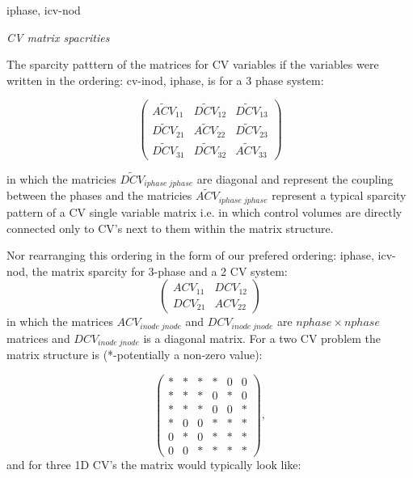 \par\noindent
iphase, icv-nod

\par\noindent
{\it CV matrix spacrities} 

The sparcity patttern of the matrices for CV variables if the variables were written 
in the ordering: cv-inod, iphase, is for a 3 phase system: 

\begin{equation}
  \begin{pmatrix}
\widetilde {ACV}_{11}  &  \widetilde {DCV}_{12}  &  \widetilde {DCV}_{13} \\
\widetilde {DCV}_{21}  &  \widetilde {ACV}_{22}  &  \widetilde {DCV}_{23} \\
\widetilde {DCV}_{31}  &  \widetilde {DCV}_{32}  &  \widetilde {ACV}_{33} 
  \end{pmatrix}
\label{CV-mat-spar}
\end{equation}

in which the matricies $\widetilde {DCV}_{iphase\; jphase}$ are diagonal and represent the 
coupling between the phases and the matricies $\widetilde {ACV}_{iphase\; jphase}$ represent 
a typical sparcity pattern of a CV single variable matrix i.e. in which control volumes are 
directly connected only to CV's next to them within the matrix structure. 

Nor rearranging this ordering in the form of our prefered ordering:  iphase, icv-nod, 
the matrix sparcity for 3-phase and a 2 CV system:
\begin{equation}
  \begin{pmatrix}
ACV_{11}  &  DCV_{12}   \\
DCV_{21}  &  ACV_{22} 
  \end{pmatrix}
\label{CV-mat-spar}
\end{equation}
in which the matrices $ACV_{inode\; jnode}$ and $DCV_{inode\; jnode}$ are $nphase \times nphase$ matrices and $DCV_{inode\; jnode}$ 
is a diagonal matrix. 
For 
a two CV problem the matrix structure is (*-potentially a non-zero value): 

\begin{equation}
  \begin{pmatrix}
*  &  *  &  *      &   *   &  0  &  0  \\ 
*  &  *  &  *      &   0   &  *  &  0  \\ 
*  &  *  &  *      &   0   &  0  &  *  \\ 
%
*  &  0  &  0      &   *   &  *  &  *  \\
0  &  *  &  0      &   *   &  *  &  *  \\
0  &  0  &  *      &   *   &  *  &  *  
  \end{pmatrix},
\label{optimal-CV-mat-spar}
\end{equation}
and for three 1D CV's the matrix would typically look like: 

